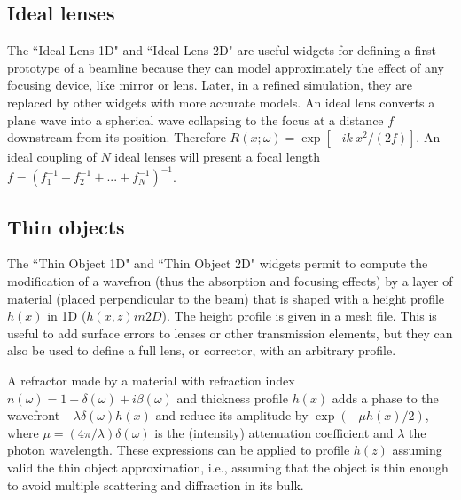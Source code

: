 \documentclass{iopconfser}
\begin{document}
\subsection{Ideal lenses}
The ``Ideal Lens 1D" and ``Ideal Lens 2D" are useful widgets for defining a first prototype of a beamline because they can model approximately the effect of any focusing device, like mirror or lens. Later, in a refined simulation, they are replaced by other widgets with more accurate models. 
An ideal lens converts a plane wave into a spherical wave collapsing to the focus at a distance $f$ downstream from its position.
Therefore $R(x;\omega) = \exp[-i k~x^2/(2 f)]$.
An ideal coupling of $N$ ideal lenses will present a focal length $f=(f_1^{-1}+f_2^{-1}+...+f_N^{-1})^{-1}$. 

\subsection{Thin objects}\label{sec:thinobject} 
The ``Thin Object 1D" and ``Thin Object 2D" widgets permit to compute the modification of a wavefron (thus the absorption and focusing effects) by a layer of material (placed perpendicular to the beam) that is shaped with a height profile $h(x)$ in 1D ($h(x,z) in 2D$). The height profile is given in a mesh file. This is useful to add surface errors to lenses or other transmission elements, but they can also be used to define a full lens, or corrector, with an arbitrary profile.    

A refractor made by a material with refraction index $n(\omega)=1-\delta(\omega)+i\beta(\omega)$ 
and thickness profile $h(x)$ adds a phase to the wavefront $-\lambda \delta(\omega) h(x)$ and reduce its amplitude by $\exp(-\mu h(x)/2)$, where $\mu=(4 \pi/\lambda) \delta(\omega)$ is the (intensity) attenuation coefficient and $\lambda$ the photon wavelength. These expressions can be applied to profile $h(z)$ assuming valid the thin object approximation, i.e., assuming that the object is thin enough to avoid multiple scattering and diffraction in its bulk. 

\end{document}
